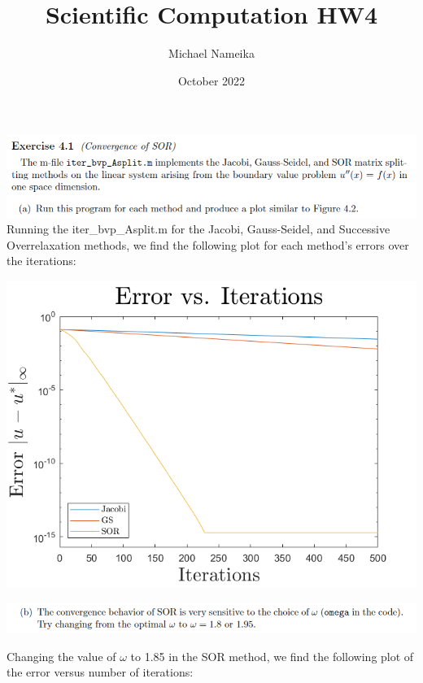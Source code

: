 \documentclass{article}
\title{Scientific Computation HW4}
\author{Michael Nameika}
\date{October 2022}
\begin{document}
\maketitle

\includegraphics[scale = 0.8]{ex4.1a.PNG}
\newline
Running the iter\_bvp\_Asplit.m for the Jacobi, Gauss-Seidel, and Successive Overrelaxation methods, we find the following plot for each method's errors over the iterations:
\begin{center}
    \includegraphics[scale = 0.6]{splittingErrors.png}
\end{center}

\includegraphics[scale = 0.8]{ex4.1b.PNG}
\newline

Changing the value of $\omega$ to 1.85 in the SOR method, we find the following plot of the error versus number of iterations:
\end{document}
